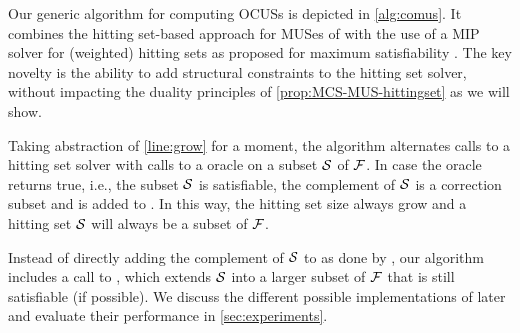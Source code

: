 %
Our generic algorithm for computing OCUSs is depicted in \cref{alg:comus}. It combines the hitting set-based approach for MUSes of \cite{ignatiev2015smallest} with the use of a MIP solver for (weighted) hitting sets as proposed for maximum satisfiability \cite{davies}. The key novelty is the ability to add structural constraints to the hitting set solver, without impacting the duality principles of \cref{prop:MCS-MUS-hittingset} as we will show.

Taking abstraction of \cref{line:grow} for a moment, 
the algorithm alternates calls to a hitting set solver with calls to a \sat oracle on a subset $\mathcal{S}$ of $\mathcal{F} $. 
In case the \sat oracle returns true, i.e., the subset $\mathcal{S}$ is satisfiable, the complement of $\mathcal{S}$ is a correction subset and is added to \setstohit. In this way, the hitting set size always grow and a hitting set $\mathcal{S}$ will always be a subset of $\mathcal{F} $.

Instead of directly adding the complement of $\mathcal{S}$ to \setstohit as done by \citet{ignatiev2015smallest}, our algorithm includes a call to \grow, which extends $\mathcal{S}$ into a larger subset of $\mathcal{F} $ that is still satisfiable (if possible).
We discuss the different possible implementations of \grow later and evaluate their performance in \cref{sec:experiments}. 

